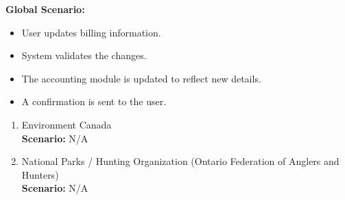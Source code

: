 \documentclass[]{article}
\begin{document}
\begin{enumerate}[{\bf BE5.}]
    {\bf Global Scenario:}\\
    \begin{itemize}
        \item User updates billing information.
        \item System validates the changes.
        \item The accounting module is updated to reflect new details.
        \item A confirmation is sent to the user.
    \end{itemize}

    \begin{enumerate}[{\bf VP5.}]
        \item Environment Canada \\  
        \textbf{Scenario:} N/A
        \item National Parks / Hunting Organization (Ontario Federation of Anglers and Hunters) \\  
        \textbf{Scenario:} N/A
    \end{enumerate}
\end{enumerate}
\end{document}
